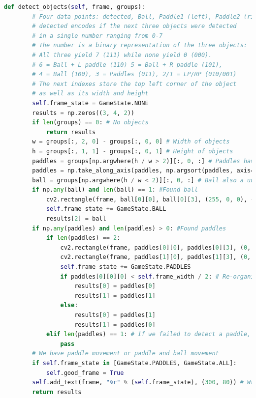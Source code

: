 \documentclass{report}
\begin{document}
\begin{lstlisting}[language=python, caption={The \texttt{detect_objects} function used in object classification.}]
    def detect_objects(self, frame, groups):
        # Four data points: detected, Ball, Paddle1 (left), Paddle2 (right)
        # detected encodes if the next three objects were detected
        # in a single number ranging from 0-7
        # The number is a binary representation of the three objects:
        # All three yield 7 (111) while none yield 0 (000).
        # 6 = Ball + L paddle (110) 5 = Ball + R paddle (101),
        # 4 = Ball (100), 3 = Paddles (011), 2/1 = LP/RP (010/001)
        # The next indexes store the top left corner of the object
        # as well as its width and height
        self.frame_state = GameState.NONE
        results = np.zeros((3, 4, 2))
        if len(groups) == 0: # No objects
            return results
        w = groups[:, 2, 0] - groups[:, 0, 0] # Width of objects 
        h = groups[:, 1, 1] - groups[:, 0, 1] # Height of objects
        paddles = groups[np.argwhere(h / w > 2)][:, 0, :] # Paddles have specific aspect ratios
        paddles = np.take_along_axis(paddles, np.argsort(paddles, axis=1), axis=1)
        ball = groups[np.argwhere(h / w < 2)][:, 0, :] # Ball also a unique aspect ratio
        if np.any(ball) and len(ball) == 1: #Found ball
            cv2.rectangle(frame, ball[0][0], ball[0][3], (255, 0, 0), -1)
            self.frame_state += GameState.BALL
            results[2] = ball
        if np.any(paddles) and len(paddles) > 0: #Found paddles
            if len(paddles) == 2:
                cv2.rectangle(frame, paddles[0][0], paddles[0][3], (0, 255, 0), -1) # draw debug rectangle
                cv2.rectangle(frame, paddles[1][0], paddles[1][3], (0, 255, 0), -1)
                self.frame_state += GameState.PADDLES
                if paddles[0][0][0] < self.frame_width / 2: # Re-organize paddles from left to right 
                    results[0] = paddles[0]
                    results[1] = paddles[1]
                else:
                    results[0] = paddles[1]
                    results[1] = paddles[0]
            elif len(paddles) == 1: # If we failed to detect a paddle, skip this frame
                pass
        # We have paddle movement or paddle and ball movement
        if self.frame_state in [GameState.PADDLES, GameState.ALL]:
            self.good_frame = True
        self.add_text(frame, "%r" % (self.frame_state), (300, 80)) # Write debug info to screen
        return results
\end{lstlisting}
\end{document}
